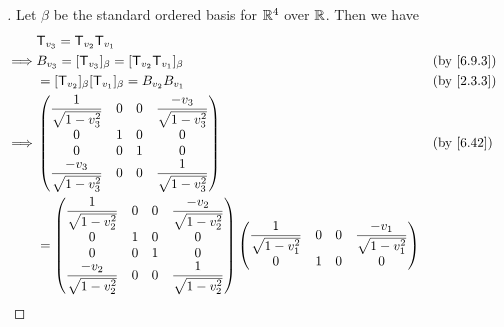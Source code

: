 \begin{proof}[]
  Let \(\beta\) be the standard ordered basis for \(\mathbb{R}^4\) over \(\mathbb{R}\).
  Then we have
  \begin{align*}
             & \T_{v_3} = \T_{v_2} \T_{v_1}                                                                                                                                           \\
    \implies & B_{v_3} = [\T_{v_3}]_{\beta} = [\T_{v_2} \T_{v_1}]_{\beta}                                                                                             &  & \by{6.9.3} \\
             & = [\T_{v_2}]_{\beta} [\T_{v_1}]_{\beta} = B_{v_2} B_{v_1}                                                                                              &  & \by{2.3.3} \\
    \implies & \begin{pmatrix}
                 \dfrac{1}{\sqrt{1 - v_3^2}}    & 0 & 0 & \dfrac{-v_3}{\sqrt{1 - v_3^2}} \\
                 0                              & 1 & 0 & 0                              \\
                 0                              & 0 & 1 & 0                              \\
                 \dfrac{-v_3}{\sqrt{1 - v_3^2}} & 0 & 0 & \dfrac{1}{\sqrt{1 - v_3^2}}
               \end{pmatrix}                                                               &  & \by{6.42}                                                                             \\
             & = \begin{pmatrix}
                   \dfrac{1}{\sqrt{1 - v_2^2}}    & 0 & 0 & \dfrac{-v_2}{\sqrt{1 - v_2^2}} \\
                   0                              & 1 & 0 & 0                              \\
                   0                              & 0 & 1 & 0                              \\
                   \dfrac{-v_2}{\sqrt{1 - v_2^2}} & 0 & 0 & \dfrac{1}{\sqrt{1 - v_2^2}}
                 \end{pmatrix} \begin{pmatrix}
                                 \dfrac{1}{\sqrt{1 - v_1^2}}    & 0 & 0 & \dfrac{-v_1}{\sqrt{1 - v_1^2}} \\
                                 0                              & 1 & 0 & 0                              \\

\end{pmatrix}
\end{align*}
\end{proof}
